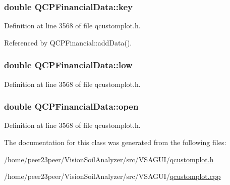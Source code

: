 \hypertarget{class_q_c_p_financial_data_a18bc92126f28c214b05b0161e5f5958b}{}
\subsubsection[{key}]{\setlength{\rightskip}{0pt plus 5cm}double Q\+C\+P\+Financial\+Data\+::key}\label{class_q_c_p_financial_data_a18bc92126f28c214b05b0161e5f5958b}


Definition at line 3568 of file qcustomplot.\+h.



Referenced by Q\+C\+P\+Financial\+::add\+Data().

\hypertarget{class_q_c_p_financial_data_aecce0fb45a115e3f3a25eea78491ac16}{}
\subsubsection[{low}]{\setlength{\rightskip}{0pt plus 5cm}double Q\+C\+P\+Financial\+Data\+::low}\label{class_q_c_p_financial_data_aecce0fb45a115e3f3a25eea78491ac16}


Definition at line 3568 of file qcustomplot.\+h.

\hypertarget{class_q_c_p_financial_data_a3059e1e1fbcb9fd243fde0450f238032}{}
\subsubsection[{open}]{\setlength{\rightskip}{0pt plus 5cm}double Q\+C\+P\+Financial\+Data\+::open}\label{class_q_c_p_financial_data_a3059e1e1fbcb9fd243fde0450f238032}


Definition at line 3568 of file qcustomplot.\+h.



The documentation for this class was generated from the following files\+:\begin{DoxyCompactItemize}
\item 
/home/peer23peer/\+Vision\+Soil\+Analyzer/src/\+V\+S\+A\+G\+U\+I/\hyperlink{qcustomplot_8h}{qcustomplot.\+h}\item 
/home/peer23peer/\+Vision\+Soil\+Analyzer/src/\+V\+S\+A\+G\+U\+I/\hyperlink{qcustomplot_8cpp}{qcustomplot.\+cpp}\end{DoxyCompactItemize}
